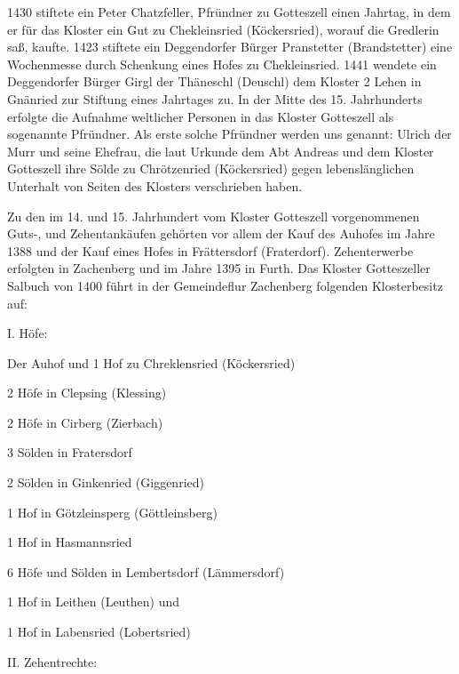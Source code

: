 \documentclass{book}
\begin{document}
1430 stiftete ein Peter Chatzfeller, Pfründner zu Gotteszell einen
Jahrtag, in dem er für das Kloster ein Gut zu Chekleinsried
(Köckersried), worauf die Gredlerin saß, kaufte. 1423 stiftete ein
Deggendorfer Bürger Pranstetter (Brandstetter) eine Wochenmesse durch
Schenkung eines Hofes zu Chekleinsried. 1441 wendete ein Deggendorfer
Bürger Girgl der Thäneschl (Deuschl) dem Kloster 2 Lehen in Gnänried zur
Stiftung eines Jahrtages zu. In der Mitte des 15. Jahrhunderts erfolgte
die Aufnahme weltlicher Personen in das Kloster Gotteszell als
sogenannte Pfründner. Als erste solche Pfründner werden uns genannt:
Ulrich der Murr und seine Ehefrau, die laut Urkunde dem Abt Andreas und
dem Kloster Gotteszell ihre Sölde zu Chrötzenried (Köckersried) gegen
lebenslänglichen Unterhalt von Seiten des Klosters verschrieben haben.

Zu den im 14. und 15. Jahrhundert vom Kloster Gotteszell vorgenommenen
Guts-, und Zehentankäufen gehörten vor allem der Kauf des Auhofes im
Jahre 1388 und der Kauf eines Hofes in Frättersdorf (Fraterdorf).
Zehenterwerbe erfolgten in Zachenberg und im Jahre 1395 in Furth. Das
Kloster Gotteszeller Salbuch von 1400 führt in der Gemeindeflur
Zachenberg folgenden Klosterbesitz auf:

I. Höfe:

\begin{compactitem}
\item Der Auhof und 1 Hof zu Chreklensried (Köckersried)
\item 2 Höfe in Clepsing (Klessing)
\item 2 Höfe in Cirberg (Zierbach)
\item 3 Sölden in Fratersdorf
\item 2 Sölden in Ginkenried (Giggenried)
\item 1 Hof in Götzleinsperg (Göttleinsberg)
\item 1 Hof in Hasmannsried
\item 6 Höfe und Sölden in Lembertsdorf (Lämmersdorf)
\item 1 Hof in Leithen (Leuthen) und
\item 1 Hof in Labensried (Lobertsried)
\end{compactitem}

II. Zehentrechte:
\end{document}
